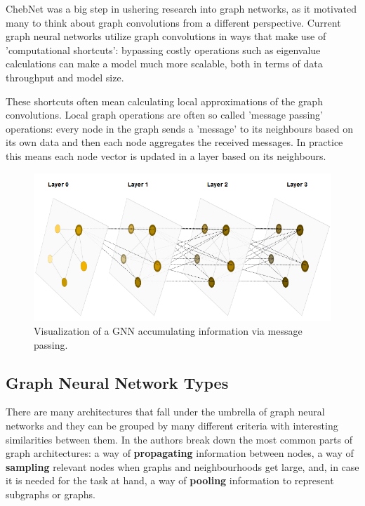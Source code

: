 	ChebNet was a big step in ushering research into graph networks, as it motivated many to think about graph convolutions from a different perspective. Current graph neural networks utilize graph convolutions in ways that make use of 'computational shortcuts': bypassing costly operations such as eigenvalue calculations can make a model much more scalable, both in terms of data throughput and model size.
	
	These shortcuts often mean calculating local approximations of the graph convolutions. Local graph operations are often so called 'message passing' operations\cite{gilmer2020message}: every node in the graph sends a 'message' to its neighbours based on its own data and then each node aggregates the received messages. In practice this means each node vector is updated in a layer based on its neighbours.
	
	\begin{figure}[!h]
		\centering
		\includegraphics[width=\textwidth]{figures/gnn.png}
		\caption{Visualization of a GNN accumulating information via message passing. \cite{sanchez-lengeling2021a}}
	\end{figure}
		
	\subsection{Graph Neural Network Types}
	
	There are many architectures that fall under the umbrella of graph neural networks and they can be grouped by many different criteria with interesting similarities between them. In \cite{gnn_review} the authors break down the most common parts of graph architectures: a way of \textbf{propagating} information between nodes, a way of \textbf{sampling} relevant nodes when graphs and neighbourhoods get large, and, in case it is needed for the task at hand, a way of \textbf{pooling} information to represent subgraphs or graphs.
	
